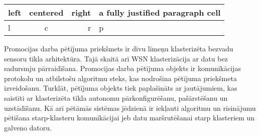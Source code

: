 \begin{table}
\caption{\textbf{\fontsize{11}{12}\selectfont {\\ \LaTeX\ font selection}}} 
\centering
	\begin{tabular}{|l|c|r|p{5cm}|}
	  \hline
	left & centered & right & a fully justified paragraph cell\\
	\hline
	  l & c & r & p\\
	  \hline
	\end{tabular}
\end{table}
Promocijas darba pētījuma priekšmets ir divu līmeņu klasterizēta bezvadu sensoru tīkla arhitektūra. Tajā skaitā arī WSN klasterizācija ar datu bez sadursmju pārraidīšana.
Promocijas darba pētījuma objekts ir komunikācijas protokolu un atbilstošu algoritmu steks, kas nodrošina pētījuma priekšmeta izveidošanu. Turklāt, pētījuma objekts tiek paplašināts ar jautājumiem, kas saistīti ar klasterizēta tīkla autonomu pārkonfigurēšanu, pašārstēšanu un uzstādīšanu. Kā arī pētāmās sistēmas jēdzienā ir iekļauti algoritmu un risinājumu pētīšana starp-klasteru komunikācijai jeb datu maršrutēšanai starp klasteriem un galveno datoru.


